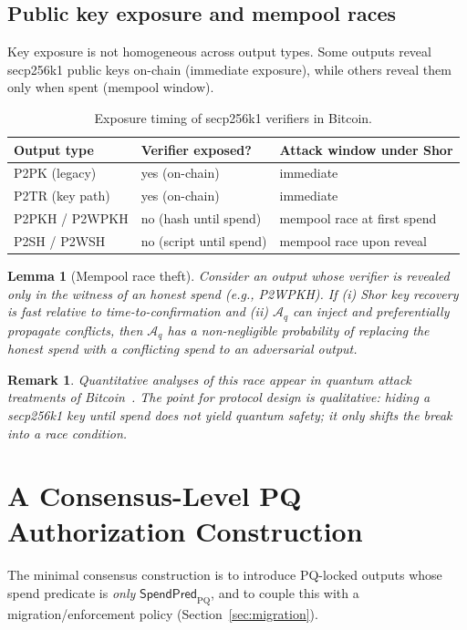 \documentclass[11pt]{article}
\newtheorem{lemma}{Lemma}
\newtheorem{remark}{Remark}
\newcommand{\Aq}{\mathcal{A}_q}
\newcommand{\SpendPred}{\mathsf{SpendPred}}
\newcommand{\SpendPredPQ}{\SpendPred_{\mathrm{PQ}}}
\begin{document}
\subsection{Public key exposure and mempool races}
Key exposure is not homogeneous across output types.
Some outputs reveal secp256k1 public keys on-chain (immediate exposure), while others reveal them only when spent (mempool window).

\begin{table}[t]
\centering
\begin{tabular}{@{}lll@{}}
\toprule
Output type & Verifier exposed? & Attack window under Shor \\
\midrule
P2PK (legacy) & yes (on-chain) & immediate \\
P2TR (key path) & yes (on-chain) & immediate \\
P2PKH / P2WPKH & no (hash until spend) & mempool race at first spend \\
P2SH / P2WSH & no (script until spend) & mempool race upon reveal \\
\bottomrule
\end{tabular}
\caption{Exposure timing of secp256k1 verifiers in Bitcoin.}
\end{table}

\begin{lemma}[Mempool race theft]\label{lem:mempool-race}
Consider an output whose verifier is revealed only in the witness of an honest spend (e.g., P2WPKH).
If (i) Shor key recovery is fast relative to time-to-confirmation and (ii) $\Aq$ can inject and preferentially propagate conflicts, then $\Aq$ has a non-negligible probability of replacing the honest spend with a conflicting spend to an adversarial output.
\end{lemma}

\begin{remark}
Quantitative analyses of this race appear in quantum attack treatments of Bitcoin~\cite{aggarwal2018quantum}.
The point for protocol design is qualitative: hiding a secp256k1 key until spend does not yield quantum safety; it only shifts the break into a race condition.
\end{remark}

\section{A Consensus-Level PQ Authorization Construction}\label{sec:construction}

The minimal consensus construction is to introduce PQ-locked outputs whose spend predicate is \emph{only} $\SpendPredPQ$, and to couple this with a migration/enforcement policy (Section~\ref{sec:migration}).
\end{document}
